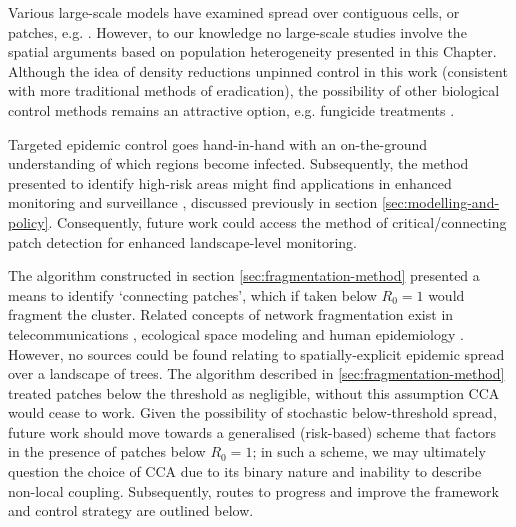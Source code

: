 Various large-scale models have examined spread over contiguous cells, or patches, e.g. \cite{gaydos2019forecasting, large-scale-control, meentemeyer2011epidemiological}.
However, to our knowledge no large-scale studies involve the spatial arguments based on population heterogeneity presented in this Chapter.
Although the idea of density reductions unpinned control in this work (consistent with more traditional methods of eradication),
the possibility of other biological control methods remains an attractive option, e.g. fungicide treatments \cite{hauptman2015application}.

Targeted epidemic control goes hand-in-hand with an on-the-ground understanding of which regions become infected.
Subsequently, the method presented to identify high-risk areas might find applications in enhanced monitoring and surveillance \cite{surveillance-review}, discussed previously in section \ref{sec:modelling-and-policy}. Consequently, future work could access the method of critical/connecting patch detection for enhanced landscape-level monitoring.

The algorithm constructed in section \ref{sec:fragmentation-method} presented a means to identify `connecting patches', which if taken below $R_0=1$ would fragment the cluster.
Related concepts of network fragmentation exist in telecommunications \cite{albert2000error}, ecological space modeling \cite{luo2021understanding} and human epidemiology \cite{chami2017social}.
However, no sources could be found relating to spatially-explicit epidemic spread over a landscape of trees.
The algorithm described in \ref{sec:fragmentation-method} treated patches below the threshold as negligible, without this assumption CCA would cease to work.
Given the possibility of stochastic below-threshold spread, future work should move towards a generalised (risk-based) scheme that factors in the presence of patches below $R_0=1$;
in such a scheme, we may ultimately question the choice of CCA due to its binary nature and inability to describe non-local coupling. Subsequently, routes to progress and improve the framework and control strategy are outlined below.


